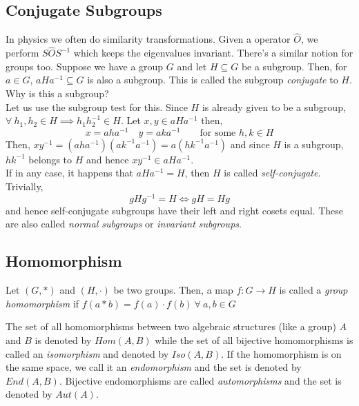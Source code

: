 \subsection{Conjugate Subgroups}
In physics we often do similarity transformations. Given a operator $\hat{O}$, we perform $S\hat{O}S^{-1}$ which keeps the eigenvalues invariant. There's a similar notion for groups too. Suppose we have a group $G$ and let $H\subseteq G$ be a subgroup. Then, for $a\in G$, $aHa^{-1} \subseteq G$ is also a subgroup. This is called the subgroup \textit{conjugate} to $H$. Why is this a subgroup?\\[0.2cm]
Let us use the subgroup test for this. Since $H$ is already given to be a subgroup, $\forall \ h_1,h_2\in H \implies h_1h_2^{-1}\in H$. Let $x,y\in aHa^{-1}$ then, 
$$x= aha^{-1}\quad y = aka^{-1}\qquad \text{for some $h,k\in H$}$$ 
Then, $xy^{-1} = (aha^{-1})(ak^{-1}a^{-1}) = a(hk^{-1}a^{-1})$ and since $H$ is a subgroup, $hk^{-1}$ belongs to $H$ and hence $xy^{-1}\in aHa^{-1}$.\\[0.2cm]
If in any case, it happens that $aHa^{-1}=H$, then $H$ is called \textit{self-conjugate}. Trivially,   $$gHg^{-1}=H \iff gH =Hg$$ and hence self-conjugate subgroups have their left and right cosets equal. These are also called \textit{normal subgroups} or \textit{invariant subgroups}.
\subsection{Homomorphism}
\begin{definition}
    Let $(G,*)$ and $(H,\cdot)$ be two groups. Then, a map $f: G\rightarrow H$ is called a \textit{group homomorphism} if $f(a*b) = f(a)\cdot f(b) \ \forall \ a,b\in G$
\end{definition}
The set of all homomorphisms between two algebraic structures (like a group) $A$ and $B$ is denoted by $Hom(A,B)$ while the set of all bijective homomorphisms is called an \textit{isomorphism} and denoted by $Iso(A,B)$. If the homomorphism is on the same space, we call it an \textit{endomorphism} and the set is denoted by $End(A,B)$. Bijective endomorphisms are called \textit{automorphisms} and the set is denoted by $Aut(A)$.
